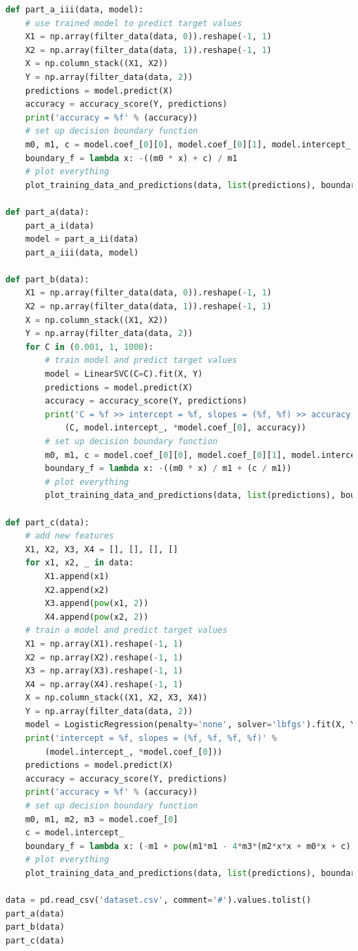 \documentclass[12pt]{article}
\begin{document}
\begin{lstlisting}[language=Python]
def part_a_iii(data, model):
    # use trained model to predict target values
    X1 = np.array(filter_data(data, 0)).reshape(-1, 1)
    X2 = np.array(filter_data(data, 1)).reshape(-1, 1)
    X = np.column_stack((X1, X2))
    Y = np.array(filter_data(data, 2))
    predictions = model.predict(X)
    accuracy = accuracy_score(Y, predictions)
    print('accuracy = %f' % (accuracy))
    # set up decision boundary function
    m0, m1, c = model.coef_[0][0], model.coef_[0][1], model.intercept_
    boundary_f = lambda x: -((m0 * x) + c) / m1
    # plot everything
    plot_training_data_and_predictions(data, list(predictions), boundary_f)

def part_a(data):
    part_a_i(data)
    model = part_a_ii(data)
    part_a_iii(data, model)

def part_b(data):
    X1 = np.array(filter_data(data, 0)).reshape(-1, 1)
    X2 = np.array(filter_data(data, 1)).reshape(-1, 1)
    X = np.column_stack((X1, X2))
    Y = np.array(filter_data(data, 2))
    for C in (0.001, 1, 1000):
        # train model and predict target values
        model = LinearSVC(C=C).fit(X, Y)
        predictions = model.predict(X)
        accuracy = accuracy_score(Y, predictions)
        print('C = %f >> intercept = %f, slopes = (%f, %f) >> accuracy = %f' %
            (C, model.intercept_, *model.coef_[0], accuracy))
        # set up decision boundary function
        m0, m1, c = model.coef_[0][0], model.coef_[0][1], model.intercept_
        boundary_f = lambda x: -((m0 * x) / m1 + (c / m1))
        # plot everything
        plot_training_data_and_predictions(data, list(predictions), boundary_f)

def part_c(data):
    # add new features
    X1, X2, X3, X4 = [], [], [], []
    for x1, x2, _ in data:
        X1.append(x1)
        X2.append(x2)
        X3.append(pow(x1, 2))
        X4.append(pow(x2, 2))
    # train a model and predict target values
    X1 = np.array(X1).reshape(-1, 1)
    X2 = np.array(X2).reshape(-1, 1)
    X3 = np.array(X3).reshape(-1, 1)
    X4 = np.array(X4).reshape(-1, 1)
    X = np.column_stack((X1, X2, X3, X4))
    Y = np.array(filter_data(data, 2))
    model = LogisticRegression(penalty='none', solver='lbfgs').fit(X, Y)
    print('intercept = %f, slopes = (%f, %f, %f, %f)' %
        (model.intercept_, *model.coef_[0]))
    predictions = model.predict(X)
    accuracy = accuracy_score(Y, predictions)
    print('accuracy = %f' % (accuracy))
    # set up decision boundary function
    m0, m1, m2, m3 = model.coef_[0]
    c = model.intercept_
    boundary_f = lambda x: (-m1 + pow(m1*m1 - 4*m3*(m2*x*x + m0*x + c), 0.5)) / 2*m3
    # plot everything
    plot_training_data_and_predictions(data, list(predictions), boundary_f)

data = pd.read_csv('dataset.csv', comment='#').values.tolist()
part_a(data)
part_b(data)
part_c(data)
\end{lstlisting}
\end{document}
